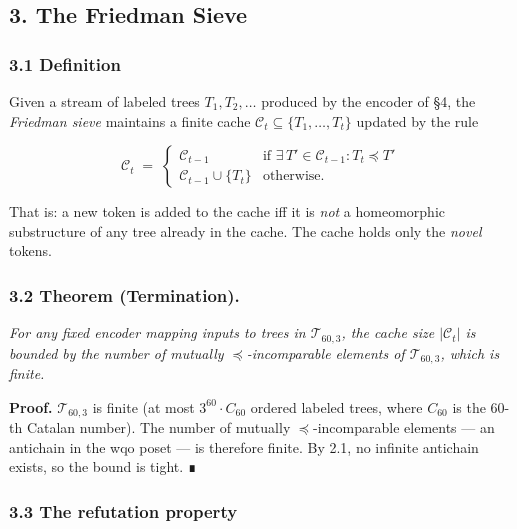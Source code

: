 \documentclass[
  11pt,
]{article}
\begin{document}
\hypertarget{the-friedman-sieve}{%
\subsection{3. The Friedman Sieve}\label{the-friedman-sieve}}

\hypertarget{definition}{%
\subsubsection{3.1 Definition}\label{definition}}

Given a stream of labeled trees \(T_1, T_2, \dots\) produced by the
encoder of §4, the \emph{Friedman sieve} maintains a finite cache
\(\mathcal{C}_t \subseteq \{T_1, \dots, T_t\}\) updated by the rule

\[\mathcal{C}_t \;=\; \begin{cases} \mathcal{C}_{t-1} & \text{if } \exists\, T' \in \mathcal{C}_{t-1} : T_t \preceq T' \\ \mathcal{C}_{t-1} \cup \{T_t\} & \text{otherwise.} \end{cases}\]

That is: a new token is added to the cache iff it is \emph{not} a
homeomorphic substructure of any tree already in the cache. The cache
holds only the \emph{novel} tokens.

\hypertarget{theorem-termination.}{%
\subsubsection{3.2 Theorem (Termination).}\label{theorem-termination.}}

\emph{For any fixed encoder mapping inputs to trees in
\(\mathcal{T}_{60,3}\), the cache size \(|\mathcal{C}_t|\) is bounded by
the number of mutually \(\preceq\)-incomparable elements of
\(\mathcal{T}_{60,3}\), which is finite.}

\textbf{Proof.} \(\mathcal{T}_{60,3}\) is finite (at most
\(3^{60} \cdot C_{60}\) ordered labeled trees, where \(C_{60}\) is the
60-th Catalan number). The number of mutually \(\preceq\)-incomparable
elements --- an antichain in the wqo poset --- is therefore finite. By
2.1, no infinite antichain exists, so the bound is tight. ∎

\hypertarget{the-refutation-property}{%
\subsubsection{3.3 The refutation
property}\label{the-refutation-property}}
\end{document}
